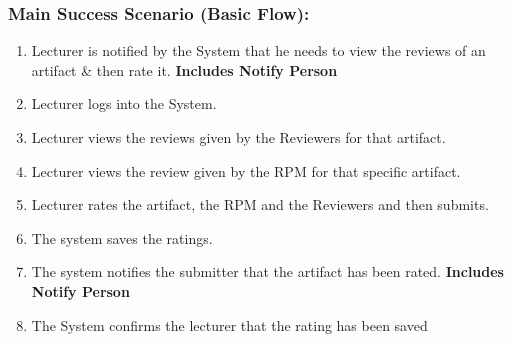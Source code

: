     \subsubsection*{Main Success Scenario (Basic Flow):}
    \begin{enumerate}
        \itemsep-1em 
        \item Lecturer is notified by the System that he needs to view the reviews of an artifact \& then rate it.  \textbf{Includes Notify Person}
        \item Lecturer logs into the System. 
        \item Lecturer views the reviews given by the Reviewers for that artifact.
         \item Lecturer views the review given by the RPM for that specific artifact.
         \item Lecturer rates the artifact, the RPM and the Reviewers and then submits.
          \item The system saves the ratings.
          \item The system notifies the submitter that the artifact has been rated. \textbf{Includes Notify Person}
          \item The System confirms the lecturer that the rating has been saved
    \end{enumerate}
    
    
    
    
